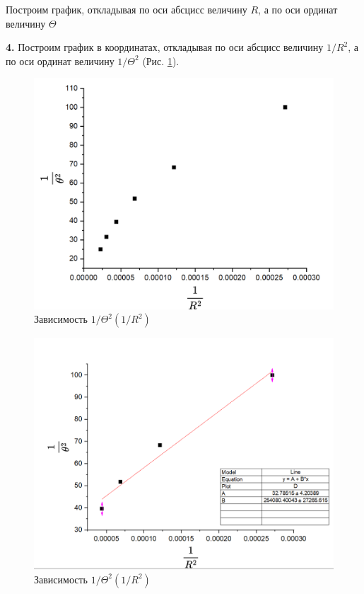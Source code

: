 \documentclass[a4paper, 12pt]{article}
\begin{document}
Построим график, откладывая по оси абсцисс величину $R$, а по оси ординат величину $\Theta$ 





\textbf{4.} Построим график в координатах, откладывая по оси абсцисс величину $1/R^2$, а по оси ординат величину $1/\Theta^2$ (Рис. \ref{G3}).

\begin{figure}[!h]
\begin{center}
\includegraphics[width=\textwidth]{G3.png}
\caption{Зависимость $1/\Theta^2(1/R^2)$} \label{G3}
\end{center}
\end{figure}

\begin{figure}[h!]
\begin{center}
\includegraphics[width=\textwidth]{G7.png}
\caption{Зависимость $1/\Theta^2(1/R^2)$} 
\end{center}
\end{figure}
\end{document}
